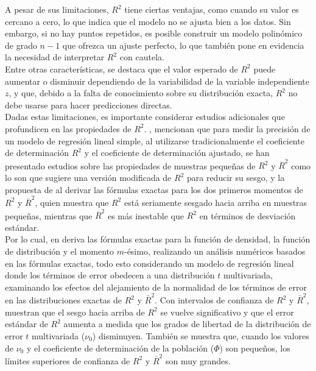 A pesar de sus limitaciones,  $R^{2}$ tiene ciertas ventajas, como cuando su valor es cercano a cero, lo que indica que el modelo no se ajusta bien a los datos. Sin embargo, si no hay puntos repetidos, es posible construir un modelo polinómico de grado $n-1$ que ofrezca un ajuste perfecto, lo que también pone en evidencia la necesidad de interpretar  $R^{2}$ con cautela.\\

Entre otras características, se destaca que el valor esperado de  $R^{2}$ puede aumentar o disminuir dependiendo de la variabilidad de la variable independiente 
$z$, y que, debido a la falta de conocimiento sobre su distribución exacta,  $R^{2}$  no debe usarse para hacer predicciones directas.\\


Dadas estas limitaciones, es importante considerar estudios adicionales que profundicen en las propiedades de $R^{2}$. \textcite{Ohtani-2004}, mencionan que para medir la precisión de un modelo de regresión lineal simple, al utilizarse tradicionalmente el coeficiente de determinación  \( R^2 \) y el coeficiente de determinación ajustado, se han presentado estudios sobre las propiedades de muestras pequeñas de \( R^2 \) y \( \overline{R}^2 \) como lo son \textcite{barten-1962} que sugiere una versión modificada de \( R^2 \) para reducir su sesgo, y la propuesta de \textcite{crammer-1987} al derivar las fórmulas exactas para los dos primeros momentos de \( R^2 \) y \( \overline{R}^2 \), quien muestra que \( R^2 \) está seriamente sesgado hacia arriba en muestras pequeñas, mientras que \( \overline{R}^2 \) es más inestable que \( R^2 \) en términos de desviación estándar.\\


Por lo cual, en \textcite{Ohtani-2004} deriva las fórmulas exactas para la función de densidad, la función de distribución y el momento \(m\)-ésimo, realizando un análisis numéricos basados en las fórmulas exactas, todo esto considerando un modelo de regresión lineal donde los términos de error obedecen a una distribución \(t\) multivariada, examinando los efectos del alejamiento de la normalidad de los términos de error en las distribuciones exactas de \(R^2\) y \(\bar{R}^2\). Con intervalos de confianza de \(R^2\) y \(\bar{R}^2\), muestran que el sesgo hacia arriba de \(R^2\) se vuelve significativo y que el error estándar de \(R^2\) aumenta a medida que los grados de libertad de la distribución de error \(t\) multivariada (\(\nu_0\)) disminuyen. También se muestra que, cuando los valores de \(\nu_0\) y el coeficiente de determinación de la población (\(\Phi\)) son pequeños, los límites superiores de confianza de \(R^2\) y \(\bar{R}^2\) son muy grandes.\\

